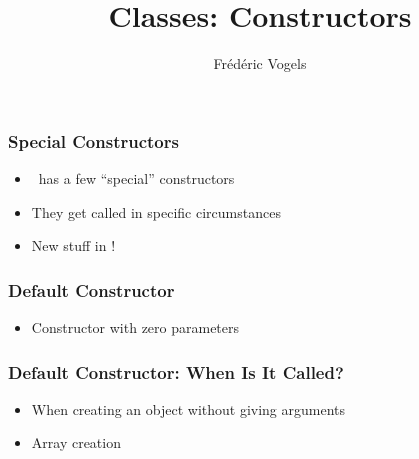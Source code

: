 \usepackage{ucll-code}
\usetikzlibrary{shadows,shapes.multipart}

\title{Classes: Constructors}
\author{Fr\'ed\'eric Vogels}

\newcommand{\highlightbox}[2][]{
  \draw[opacity=.75,ultra thick,red,#1] ($ (#2.south west) + (-.1,-.1) $) rectangle ($ (#2.north east) + (.1,.1) $)
}




\begin{frame}
  \titlepage
\end{frame}

\begin{frame}
  \frametitle{Special Constructors}
  \begin{itemize}
    \item \cpp\ has a few ``special'' constructors
    \item They get called in specific circumstances
    \item New stuff in !
  \end{itemize}
\end{frame}

\begin{frame}
  \frametitle{Default Constructor}
  \begin{itemize}
    \item Constructor with zero parameters
  \end{itemize}
\end{frame}

\begin{frame}
  \frametitle{Default Constructor: When Is It Called?}
  \begin{itemize}
    \item When creating an object without giving arguments
    \item Array creation
  \end{itemize}
  \vskip5mm
\end{frame}

